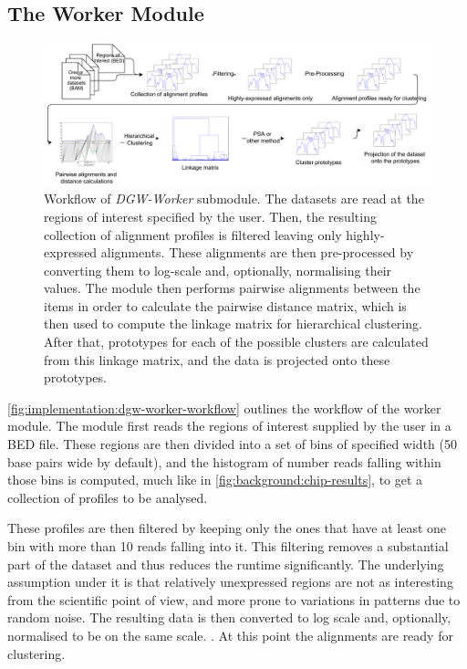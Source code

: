 \documentclass[parskip]{cs4rep}
\begin{document}
\subsection{The Worker Module}
\begin{figure}
    \centering
    \includegraphics[width=1.1\textwidth]{figures/implementation/DGW-worker-workflow.pdf}
    \caption{Workflow of \emph{DGW-Worker} submodule. The datasets are read at the regions of interest specified by the user. Then, the resulting collection of alignment profiles is filtered leaving only highly-expressed alignments. These alignments are then pre-processed by converting them to log-scale and, optionally, normalising their values. The module then performs pairwise alignments between the items in order to calculate the pairwise distance matrix, which is then used to compute the linkage matrix for hierarchical clustering. After that, prototypes for each of the possible clusters are calculated from this linkage matrix, and the data is projected onto these prototypes.}
    \label{fig:implementation:dgw-worker-workflow}
\end{figure}

\autoref{fig:implementation:dgw-worker-workflow} outlines the workflow of the worker module.
The module first reads the regions of interest supplied by the user in a BED file. These regions are then divided into a set of bins of specified width (50 base pairs wide by default), and the histogram of number reads falling within those bins is computed, much like in \autoref{fig:background:chip-results}, to get a collection of profiles to be analysed. 

These profiles are then filtered by keeping only the ones that have at least one bin with more than 10 reads falling into it.  This filtering removes a substantial part of the dataset and thus reduces the runtime significantly. The underlying assumption under it is that relatively unexpressed regions are not as interesting from the scientific point of view, and more prone to variations in patterns due to random noise. The resulting data is then converted to log scale and, optionally, normalised to be on the same scale. . At this point the alignments are ready for clustering. 
\end{document}

